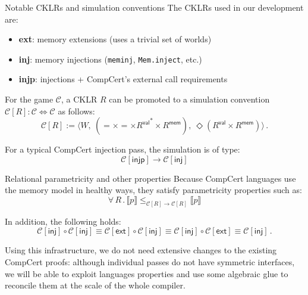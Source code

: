 \documentclass{beamer}
\newcommand{\kw}[1]{\ensuremath{ \mathsf{#1} }}
\begin{document}
\begin{frame}{Notable CKLRs and simulation conventions} %
The CKLRs used in our development are:
\begin{itemize}
  \item \textbf{ext}: memory extensions (uses a trivial set of worlds)
  \item \textbf{inj}: memory injections (\texttt{meminj},
    \texttt{Mem.inject}, etc.)
  \item \textbf{injp}: injections + CompCert's external call requirements
\end{itemize}

\vspace{1em}
For the game $\mathcal{C}$,
a CKLR $R$ can be promoted to a simulation convention
$\mathcal{C}[R] : \mathcal{C} \Leftrightarrow \mathcal{C}$
as follows:
\[
    \mathcal{C}[R] := \langle
      W, \:
      ({=} \times {=} \times {R^\kw{val}}^* \times R^\kw{mem}), \:
      \Diamond (R^\kw{val} \times R^\kw{mem})
    \rangle \,.
\]

\vspace{1em}
For a typical CompCert injection pass,
the simulation is of type:
\[
    \mathcal{C}[\kw{injp}] \rightarrow \mathcal{C}[\kw{inj}]
\]
\end{frame}

\begin{frame}{Relational parametricity and other properties} %
Because CompCert languages use the memory model
in healthy ways,
they satisfy parametricity properties such as:
\[
    \forall \, R \,.\,
      \llbracket p \rrbracket
      \le_{\mathcal{C}[R] \rightarrow \mathcal{C}[R]}
      \llbracket p \rrbracket
\]

\vspace{1em}
In addition, the following holds:
\[
  \mathcal{C}[\kw{inj}] \circ \mathcal{C}[\kw{inj}] \equiv
  \mathcal{C}[\kw{ext}] \circ \mathcal{C}[\kw{inj}] \equiv
  \mathcal{C}[\kw{inj}] \circ \mathcal{C}[\kw{ext}] \equiv
  \mathcal{C}[\kw{inj}] \,.
\]

Using this infrastructure,
we do not need extensive changes to the existing CompCert proofs:
although individual passes do not have symmetric interfaces,
we will be able to exploit languages properties
and use some algebraic glue
to reconcile them at the scale of the whole compiler.
\end{frame}
\end{document}
